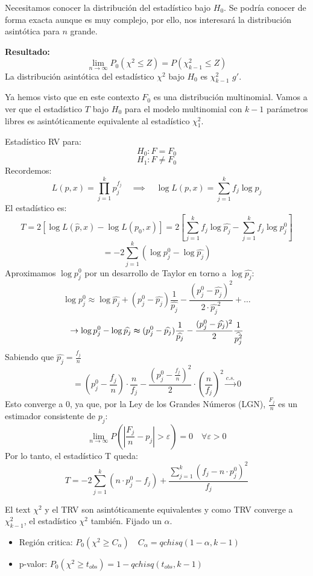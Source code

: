 Necesitamos conocer la distribución del estadístico bajo $H_0$.
Se podría conocer de forma exacta aunque es muy complejo, por ello, nos interesará la distribución asintótica para $n$ grande.

\smallskip

\noindent \textbf{Resultado:}
\[
    \lim_{n \to \infty} P_0(\chi^2 \leq Z)=P(\chi^2_{k-1} \leq Z)
\]
La distribución asintótica del estadístico $\chi^2$ bajo $H_0$ es $\chi^2_{k-1}$ $g'$.

\newpage

Ya hemos visto que en este contexto $ F_0 $ es una distribución multinomial. 
Vamos a ver que el estadístico $ T $ bajo $ H_0 $ para el modelo multinomial con $ k-1 $ parámetros libres es asintóticamente equivalente al estadístico $ \chi^2_1 $.

\begin{proofs}
Estadístico RV para:
\[
    H_0: F = F_0
\]
\[
    H_1: F \neq F_0
\]
Recordemos:
\[
    L(p, x) = \prod_{j=1}^{k} p_j^{f_j} \quad \implies \quad \log L(p, x) = \sum_{j=1}^{k} f_j \log p_j
\]
El estadístico es:
\[
    T = 2 \left[\log L(\widehat{p}, x) - \log L(p_0, x)\right] = 2 \left[ \sum_{j=1}^{k} f_j \log \widehat{p_j} - \sum_{j=1}^{k} f_j \log p_j^0 \right] 
\]
\[
    = -2 \sum_{j=1}^{k} \left( \log p_j^0 - \log \widehat{p_j} \right)
\]
Aproximamos $\log p_j^0$ por un desarrollo de Taylor en torno a $\log \widehat{p_j}$:
\[
    \log p_j^0 \approx \log \widehat{p_j} + (p_j^0 - \widehat{p_j}) \frac{1}{\widehat{p_j}} - \frac{(p_j^0 - \widehat{p_j})^2}{2 \cdot \widehat{p_j}^2}+ \dots
\]
\[
    \to \log p_j^0- \log \widehat{p_j}\thickapprox (p^0_j-\widehat{p_j}) \frac{1}{\widehat{p_j}}- \frac{(p^0_j-\widehat{p_j})^2}{2}\frac{1}{\widehat{p_j^2}}
\]
Sabiendo que $\widehat{p_j}=\frac{f_j}{n}$
\[
    =\left(p_j^0-\frac{f_j}{n}\right) \cdot \frac{n}{f_j} - \frac{\left(p_j^0-\frac{f_j}{n}\right)^2}{2}\cdot \left(\frac{n}{f_j}\right)^2 \xrightarrow{c.s.} 0
\]
Esto converge a 0, ya que, por la Ley de los Grandes Números (LGN), $\frac{F_j}{n}$ es un estimador consistente de $p_j$:
\[
    \lim_{n \to \infty} P \left( \left| \frac{F_j}{n} - p_j \right| > \varepsilon \right) = 0 \quad \forall \varepsilon>0
\]
Por lo tanto, el estadístico T queda:
\[
    T = -2 \sum_{j=1}^{k} \left( n \cdot p_j^0 - f_j \right) + \frac{\sum_{j=1}^{k} (f_j - n \cdot p_j^0)^2}{f_j}
\]
\end{proofs}

\newpage

El text $\chi^2$ y el TRV son asintóticamente equivalentes y como TRV converge a $\chi^2_{k-1}$, el estadístico $\chi^2$ también.
Fijado un $\alpha$.
\begin{itemize}
    \item Región critica: $P_0(\chi^2 \geq C_\alpha) \quad C_\alpha=qchisq(1-\alpha,k-1)$
    \item p-valor: $P_0(\chi^2 \geq t_{obs})=1-qchisq(t_{obs},k-1)$
\end{itemize}

